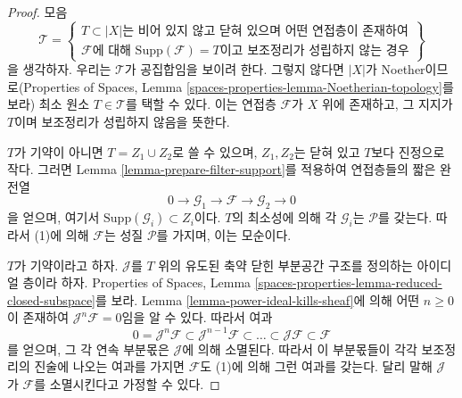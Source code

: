 \begin{proof}
모음
$$
\mathcal{T} =
\left\{
\begin{matrix}
T \subset |X|
\text{는 비어 있지 않고 닫혀 있으며 어떤 연접층이 존재하여} \\
\mathcal{F}
\text{에 대해 }
\text{Supp}(\mathcal{F}) = T
\text{이고 보조정리가 성립하지 않는 경우}
\end{matrix}
\right\}
$$
을 생각하자. 우리는 $\mathcal{T}$가 공집합임을 보이려 한다. 그렇지
않다면 $|X|$가 Noether이므로(Properties of Spaces, Lemma
\ref{spaces-properties-lemma-Noetherian-topology}를 보라) 최소 원소
$T \in \mathcal{T}$를 택할 수 있다. 이는 연접층 $\mathcal{F}$가
$X$ 위에 존재하고, 그 지지가 $T$이며 보조정리가 성립하지 않음을 뜻한다.

\medskip\noindent
$T$가 기약이 아니면 $T = Z_1 \cup Z_2$로 쓸 수 있으며,
$Z_1, Z_2$는 닫혀 있고 $T$보다 진정으로 작다. 그러면 Lemma
\ref{lemma-prepare-filter-support}를 적용하여 연접층들의 짧은 완전열
$$
0 \to
\mathcal{G}_1 \to
\mathcal{F} \to
\mathcal{G}_2 \to 0
$$
을 얻으며, 여기서 $\text{Supp}(\mathcal{G}_i) \subset Z_i$이다.
$T$의 최소성에 의해 각 $\mathcal{G}_i$는 $\mathcal{P}$를 갖는다.
따라서 (1)에 의해 $\mathcal{F}$는 성질 $\mathcal{P}$를 가지며, 이는
모순이다.

\medskip\noindent
$T$가 기약이라고 하자. $\mathcal{J}$를 $T$ 위의 유도된 축약 닫힌
부분공간 구조를 정의하는 아이디얼 층이라 하자. Properties of Spaces,
Lemma \ref{spaces-properties-lemma-reduced-closed-subspace}를 보라.
Lemma \ref{lemma-power-ideal-kills-sheaf}에 의해 어떤 $n \geq 0$이
존재하여 $\mathcal{J}^n\mathcal{F} = 0$임을 알 수 있다. 따라서 여과
$$
0 = \mathcal{J}^n\mathcal{F} \subset \mathcal{J}^{n - 1}\mathcal{F}
\subset \ldots \subset \mathcal{J}\mathcal{F} \subset \mathcal{F}
$$
를 얻으며, 그 각 연속 부분몫은 $\mathcal{J}$에 의해 소멸된다.
따라서 이 부분몫들이 각각 보조정리의 진술에 나오는 여과를 가지면
$\mathcal{F}$도 (1)에 의해 그런 여과를 갖는다. 달리 말해
$\mathcal{J}$가 $\mathcal{F}$를 소멸시킨다고 가정할 수 있다.


\end{proof}
